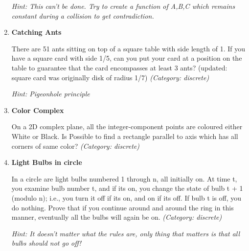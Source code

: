 \begin{enumerate}
\small\emph{Hint: This can't be done. Try to create a function of A,B,C which remains constant during a collision to get contradiction.}





\item \textbf{Catching Ants}

There are 51 ants sitting on top of a square table with side length of 1. If you have a square card with side 1/5, can you put your card at a position on the table to guarantee that the card encompasses at least 3 ants?
(updated: square card was originally disk of radius 1/7)
\small\emph{(Category: discrete)}

\small\emph{Hint: Pigeonhole principle}





\item \textbf{Color Complex}

On a 2D complex plane, all the integer-component points are coloured either White or Black. Is Possible to find a rectangle parallel to axis which has all corners of same color?
\small\emph{(Category: discrete)}




\item \textbf{Light Bulbs in circle}

In a circle are light bulbs numbered 1 through n, all initially on. At time t, you examine bulb number t, and if its on, you change the state of bulb t + 1 (modulo n); i.e., you turn it off if its on, and on if its off. If bulb t is off, you do nothing. Prove that if you continue around and around the ring in this manner, eventually all the bulbs will again be on.
\small\emph{(Category: discrete)}

\small\emph{Hint: It doesn't matter what the rules are, only thing that matters is that all bulbs should not go off!}





\end{enumerate}
